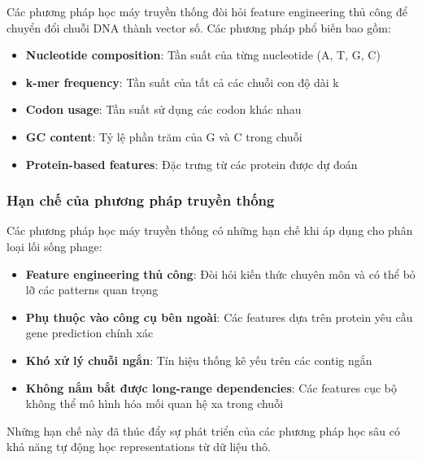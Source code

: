 Các phương pháp học máy truyền thống đòi hỏi feature engineering thủ công để chuyển đổi chuỗi DNA thành vector số. Các phương pháp phổ biến bao gồm:

\begin{itemize}
    \item \textbf{Nucleotide composition}: Tần suất của từng nucleotide (A, T, G, C)
    \item \textbf{k-mer frequency}: Tần suất của tất cả các chuỗi con độ dài k
    \item \textbf{Codon usage}: Tần suất sử dụng các codon khác nhau
    \item \textbf{GC content}: Tỷ lệ phần trăm của G và C trong chuỗi
    \item \textbf{Protein-based features}: Đặc trưng từ các protein được dự đoán
\end{itemize}

\subsubsection{Hạn chế của phương pháp truyền thống}

Các phương pháp học máy truyền thống có những hạn chế khi áp dụng cho phân loại lối sống phage:

\begin{itemize}
    \item \textbf{Feature engineering thủ công}: Đòi hỏi kiến thức chuyên môn và có thể bỏ lỡ các patterns quan trọng
    \item \textbf{Phụ thuộc vào công cụ bên ngoài}: Các features dựa trên protein yêu cầu gene prediction chính xác
    \item \textbf{Khó xử lý chuỗi ngắn}: Tín hiệu thống kê yếu trên các contig ngắn
    \item \textbf{Không nắm bắt được long-range dependencies}: Các features cục bộ không thể mô hình hóa mối quan hệ xa trong chuỗi
\end{itemize}

Những hạn chế này đã thúc đẩy sự phát triển của các phương pháp học sâu có khả năng tự động học representations từ dữ liệu thô.
